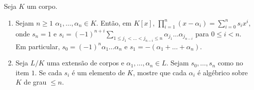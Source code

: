 \begin{exer} Seja $K$ um corpo.
    
    \begin{enumerate}
        \item Sejam $n\geq 1$ $\alpha_1, \dots, \alpha_n \in K$. Então, em $K[x]$, $\prod_{i=1}^n (x-\alpha_i)=\sum_{i=0}^n s_i x^i$, onde $s_n=1$ e $s_i=(-1)^{n+i}\sum_{1\leq j_1<\dots<j_{n-i}\leq n}\alpha_{j_1}\dots \alpha_{j_{n-i}}$ para $0\leq i<n$. Em particular, $s_0=(-1)^n \alpha_1\dots\alpha_n$ e $s_1=-(\alpha_1+\dots+\alpha_n)$.
        \item Seja $L/K$ uma extensão de corpos e $\alpha_1, \dots, \alpha_n \in L$. Sejam $s_0, \dots, s_n$ como no item $1$. Se cada $s_i$ é um elemento de $K$, mostre que cada $\alpha_i$ é algébrico sobre $K$ de grau $\leq n$.
    \end{enumerate}
\end{exer}